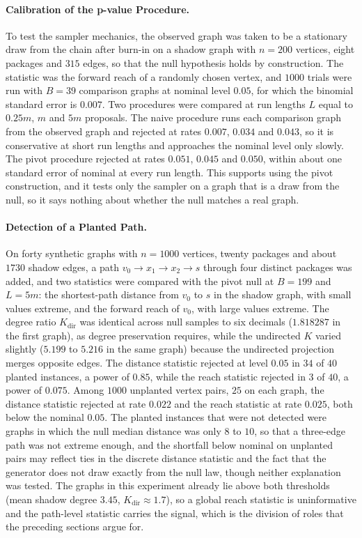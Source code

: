 \documentclass[11pt]{article}
\begin{document}
\paragraph{Calibration of the p-value Procedure.} To test the sampler mechanics, the observed graph was taken to be a stationary draw from the chain after burn-in on a shadow graph with $n=200$ vertices, eight packages and $315$ edges, so that the null hypothesis holds by construction. The statistic was the forward reach of a randomly chosen vertex, and $1000$ trials were run with $B=39$ comparison graphs at nominal level $0.05$, for which the binomial standard error is $0.007$. Two procedures were compared at run lengths $L$ equal to $0.25m$, $m$ and $5m$ proposals. The naive procedure runs each comparison graph from the observed graph and rejected at rates $0.007$, $0.034$ and $0.043$, so it is conservative at short run lengths and approaches the nominal level only slowly. The pivot procedure rejected at rates $0.051$, $0.045$ and $0.050$, within about one standard error of nominal at every run length. This supports using the pivot construction, and it tests only the sampler on a graph that is a draw from the null, so it says nothing about whether the null matches a real graph.

\paragraph{Detection of a Planted Path.} On forty synthetic graphs with $n=1000$ vertices, twenty packages and about $1730$ shadow edges, a path $v_0\to x_1\to x_2\to s$ through four distinct packages was added, and two statistics were compared with the pivot null at $B=199$ and $L=5m$: the shortest-path distance from $v_0$ to $s$ in the shadow graph, with small values extreme, and the forward reach of $v_0$, with large values extreme. The degree ratio $K_{\mathrm{dir}}$ was identical across null samples to six decimals ($1.818287$ in the first graph), as degree preservation requires, while the undirected $K$ varied slightly ($5.199$ to $5.216$ in the same graph) because the undirected projection merges opposite edges. The distance statistic rejected at level $0.05$ in $34$ of $40$ planted instances, a power of $0.85$, while the reach statistic rejected in $3$ of $40$, a power of $0.075$. Among $1000$ unplanted vertex pairs, $25$ on each graph, the distance statistic rejected at rate $0.022$ and the reach statistic at rate $0.025$, both below the nominal $0.05$. The planted instances that were not detected were graphs in which the null median distance was only $8$ to $10$, so that a three-edge path was not extreme enough, and the shortfall below nominal on unplanted pairs may reflect ties in the discrete distance statistic and the fact that the generator does not draw exactly from the null law, though neither explanation was tested. The graphs in this experiment already lie above both thresholds (mean shadow degree $3.45$, $K_{\mathrm{dir}}\approx 1.7$), so a global reach statistic is uninformative and the path-level statistic carries the signal, which is the division of roles that the preceding sections argue for.
\end{document}
